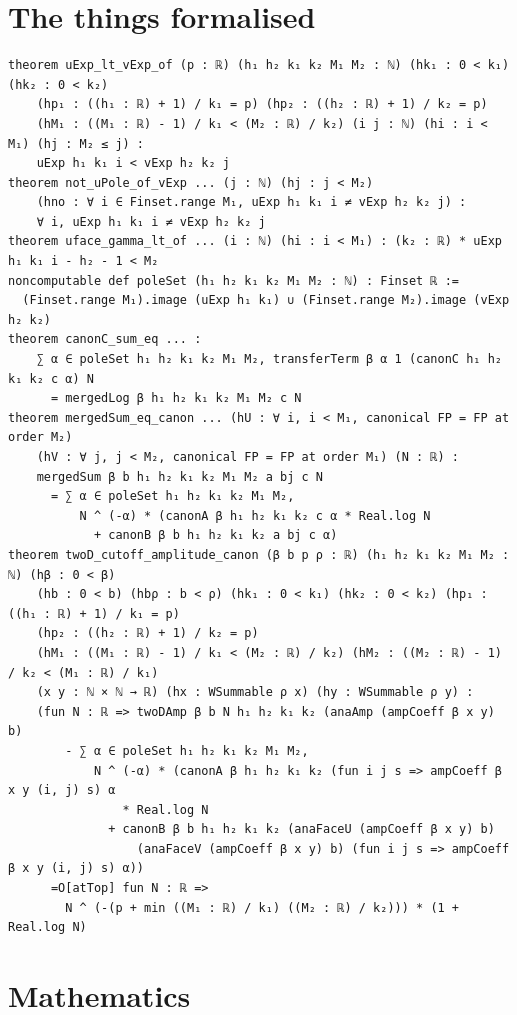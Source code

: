 \documentclass[11pt]{article}
\begin{document}
\section{The things formalised}
{\small
\begin{verbatim}
theorem uExp_lt_vExp_of (p : ℝ) (h₁ h₂ k₁ k₂ M₁ M₂ : ℕ) (hk₁ : 0 < k₁) (hk₂ : 0 < k₂)
    (hp₁ : ((h₁ : ℝ) + 1) / k₁ = p) (hp₂ : ((h₂ : ℝ) + 1) / k₂ = p)
    (hM₁ : ((M₁ : ℝ) - 1) / k₁ < (M₂ : ℝ) / k₂) (i j : ℕ) (hi : i < M₁) (hj : M₂ ≤ j) :
    uExp h₁ k₁ i < vExp h₂ k₂ j
theorem not_uPole_of_vExp ... (j : ℕ) (hj : j < M₂)
    (hno : ∀ i ∈ Finset.range M₁, uExp h₁ k₁ i ≠ vExp h₂ k₂ j) :
    ∀ i, uExp h₁ k₁ i ≠ vExp h₂ k₂ j
theorem uface_gamma_lt_of ... (i : ℕ) (hi : i < M₁) : (k₂ : ℝ) * uExp h₁ k₁ i - h₂ - 1 < M₂
noncomputable def poleSet (h₁ h₂ k₁ k₂ M₁ M₂ : ℕ) : Finset ℝ :=
  (Finset.range M₁).image (uExp h₁ k₁) ∪ (Finset.range M₂).image (vExp h₂ k₂)
theorem canonC_sum_eq ... :
    ∑ α ∈ poleSet h₁ h₂ k₁ k₂ M₁ M₂, transferTerm β α 1 (canonC h₁ h₂ k₁ k₂ c α) N
      = mergedLog β h₁ h₂ k₁ k₂ M₁ M₂ c N
theorem mergedSum_eq_canon ... (hU : ∀ i, i < M₁, canonical FP = FP at order M₂)
    (hV : ∀ j, j < M₂, canonical FP = FP at order M₁) (N : ℝ) :
    mergedSum β b h₁ h₂ k₁ k₂ M₁ M₂ a bj c N
      = ∑ α ∈ poleSet h₁ h₂ k₁ k₂ M₁ M₂,
          N ^ (-α) * (canonA β h₁ h₂ k₁ k₂ c α * Real.log N
            + canonB β b h₁ h₂ k₁ k₂ a bj c α)
theorem twoD_cutoff_amplitude_canon (β b p ρ : ℝ) (h₁ h₂ k₁ k₂ M₁ M₂ : ℕ) (hβ : 0 < β)
    (hb : 0 < b) (hbρ : b < ρ) (hk₁ : 0 < k₁) (hk₂ : 0 < k₂) (hp₁ : ((h₁ : ℝ) + 1) / k₁ = p)
    (hp₂ : ((h₂ : ℝ) + 1) / k₂ = p)
    (hM₁ : ((M₁ : ℝ) - 1) / k₁ < (M₂ : ℝ) / k₂) (hM₂ : ((M₂ : ℝ) - 1) / k₂ < (M₁ : ℝ) / k₁)
    (x y : ℕ × ℕ → ℝ) (hx : WSummable ρ x) (hy : WSummable ρ y) :
    (fun N : ℝ => twoDAmp β b N h₁ h₂ k₁ k₂ (anaAmp (ampCoeff β x y) b)
        - ∑ α ∈ poleSet h₁ h₂ k₁ k₂ M₁ M₂,
            N ^ (-α) * (canonA β h₁ h₂ k₁ k₂ (fun i j s => ampCoeff β x y (i, j) s) α
                * Real.log N
              + canonB β b h₁ h₂ k₁ k₂ (anaFaceU (ampCoeff β x y) b)
                  (anaFaceV (ampCoeff β x y) b) (fun i j s => ampCoeff β x y (i, j) s) α))
      =O[atTop] fun N : ℝ =>
        N ^ (-(p + min ((M₁ : ℝ) / k₁) ((M₂ : ℝ) / k₂))) * (1 + Real.log N)
\end{verbatim}
}

\section{Mathematics}
\end{document}
